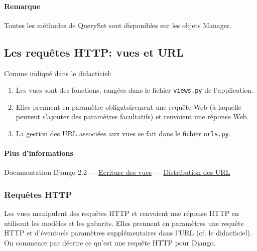 \documentclass[a4paper, 10pt]{article}
\begin{document}
\paragraph*{Remarque} Toutes les méthodes de QuerySet sont disponibles sur les objets Manager.

\subsection{Les requêtes HTTP: vues et URL}
Comme indiqué dans le didacticiel:
\begin{enumerate}
    \item Les vues sont des fonctions, rangées dans le fichier \texttt{views.py} de l'application.
    \item Elles prennent en paramètre obligatoirement une requête Web (à laquelle peuvent s'ajouter des paramètres facultatifs) et renvoient une réponse Web.
    \item La gestion des URL associées aux vues se fait dans le fichier \texttt{urls.py}.
\end{enumerate}

\paragraph{Plus d'informations} Documentation Django 2.2 --- \href{https://docs.djangoproject.com/fr/2.2/topics/http/views/}{Ecriture des vues} ---  \href{https://docs.djangoproject.com/fr/2.2/topics/http/urls/}{Distribution des URL}

\subsubsection{Requêtes HTTP}
Les  vues manipulent des requêtes HTTP et renvoient une réponse HTTP en utilisant les modèles et les gabarits. Elles prennent en paramètres une requête HTTP et d'éventuels paramètres supplémentaires dans l'URL (cf. le didacticiel). On commence par décrire ce qu'est une requête HTTP pour Django.
\end{document}
